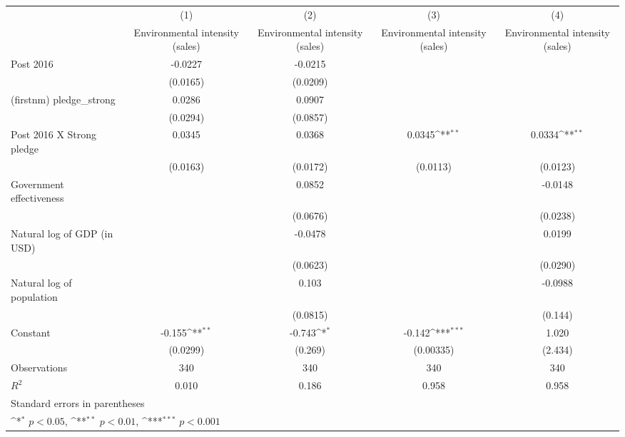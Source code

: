 {
\def\sym#1{\ifmmode^{#1}\else\(^{#1}\)\fi}
\begin{tabular}{l*{4}{c}}
\hline\hline
                    &\multicolumn{1}{c}{(1)}&\multicolumn{1}{c}{(2)}&\multicolumn{1}{c}{(3)}&\multicolumn{1}{c}{(4)}\\
                    &\multicolumn{1}{c}{Environmental intensity (sales)}&\multicolumn{1}{c}{Environmental intensity (sales)}&\multicolumn{1}{c}{Environmental intensity (sales)}&\multicolumn{1}{c}{Environmental intensity (sales)}\\
\hline
Post 2016           &     -0.0227         &     -0.0215         &                     &                     \\
                    &    (0.0165)         &    (0.0209)         &                     &                     \\
[1em]
(firstnm) pledge\_strong&      0.0286         &      0.0907         &                     &                     \\
                    &    (0.0294)         &    (0.0857)         &                     &                     \\
[1em]
Post 2016 X Strong pledge&      0.0345         &      0.0368         &      0.0345\sym{**} &      0.0334\sym{**} \\
                    &    (0.0163)         &    (0.0172)         &    (0.0113)         &    (0.0123)         \\
[1em]
Government effectiveness&                     &      0.0852         &                     &     -0.0148         \\
                    &                     &    (0.0676)         &                     &    (0.0238)         \\
[1em]
Natural log of GDP (in USD)&                     &     -0.0478         &                     &      0.0199         \\
                    &                     &    (0.0623)         &                     &    (0.0290)         \\
[1em]
Natural log of population&                     &       0.103         &                     &     -0.0988         \\
                    &                     &    (0.0815)         &                     &     (0.144)         \\
[1em]
Constant            &      -0.155\sym{**} &      -0.743\sym{*}  &      -0.142\sym{***}&       1.020         \\
                    &    (0.0299)         &     (0.269)         &   (0.00335)         &     (2.434)         \\
\hline
Observations        &         340         &         340         &         340         &         340         \\
\(R^{2}\)           &       0.010         &       0.186         &       0.958         &       0.958         \\
\hline\hline
\multicolumn{5}{l}{\footnotesize Standard errors in parentheses}\\
\multicolumn{5}{l}{\footnotesize \sym{*} \(p<0.05\), \sym{**} \(p<0.01\), \sym{***} \(p<0.001\)}\\
\end{tabular}
}
